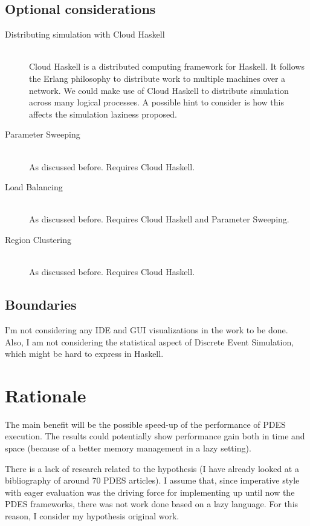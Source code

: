 \documentclass[a4paper]{article}
\begin{document}
\subsection{Optional considerations}

\begin{description}
\item[Distributing simulation with Cloud Haskell] \hfill \\
Cloud Haskell is a distributed computing framework for Haskell. It
follows the Erlang philosophy to distribute work to multiple machines
over a network. We could make use of Cloud Haskell to distribute simulation
across many logical processes. A possible hint to consider is how
this affects the simulation laziness proposed.
\item[Parameter Sweeping] \hfill \\
As discussed before. Requires Cloud Haskell.
\item[Load Balancing] \hfill \\
As discussed before. Requires Cloud Haskell and Parameter Sweeping.
\item[Region Clustering] \hfill \\
As discussed before. Requires Cloud Haskell.
\end{description}


\subsection{Boundaries}

I'm not considering any IDE and GUI visualizations in the work to be done.
Also, I am not considering the statistical aspect of Discrete Event Simulation, which
might be hard to express in Haskell.


\section{Rationale}

The main benefit will be the possible speed-up of the performance
of PDES execution. The results could potentially show performance gain
both in time and space (because of a better memory management in a lazy setting).

There is a lack of research related to the hypothesis (I have
already looked at a bibliography of around 70 PDES articles).
I assume that, since imperative style with eager evaluation
was the driving force for implementing up until now the PDES frameworks, there was
not work done based on a lazy language. For this reason, I consider my hypothesis original work.
\end{document}
